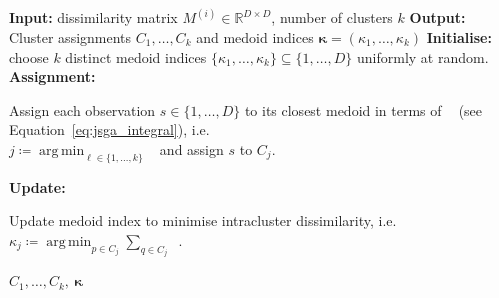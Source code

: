 \documentclass[12pt]{article}
\DeclareMathOperator*{\argmin}{arg\,min}
\newcommand{\eJSGa}[1]{\mathop{\mathrm{eJS}_{i, #1}^{\mathrm{G}_{\lambda}}}\nolimits}
\begin{document}
\begin{algorithm}[H]
  \caption{Partitioning Around Medoids (PAM) algorithm using the $\eJSGa{}$ divergence.}
  \label{alg:kmedoids_kappa}
  \begin{algorithmic}[1]
    \State \textbf{Input:} dissimilarity matrix $M^{(i)}\in\mathbb{R}^{D\times D}$, number of clusters $k$
    \State \textbf{Output:} Cluster assignments $C_1,\dots,C_k$ and medoid indices $\boldsymbol{\kappa}=(\kappa_1,\dots,\kappa_k)$
    \State \textbf{Initialise:} choose $k$ distinct medoid indices $\{\kappa_1,\dots,\kappa_k\}\subseteq\{1,\dots,D\}$ uniformly at random.
    \Repeat
    \State \textbf{Assignment:} \parbox[t]{.82\linewidth}{\raggedright Assign each observation $s\in\{1,\dots,D\}$ to its closest medoid in terms of $\eJSGa{}$ (see Equation~\eqref{eq:jsga_integral}), i.e.\ \\ $j \coloneq \argmin_{\ell\in\{1,\dots,k\}} \eJSGa{s,\kappa_\ell}$ and assign $s$ to $C_j$.}
        \State \textbf{Update:} \parbox[t]{.82\linewidth}{\raggedright Update medoid index to minimise intracluster dissimilarity, i.e.\ $\kappa_j \coloneq \argmin_{p\in C_j}\sum_{q\in C_j} \eJSGa{p,q}$.}
        \State {}
      \EndFor
    \State \Return $C_1,\dots,C_k,\ \boldsymbol{\kappa}$
  \end{algorithmic}
\end{algorithm}


\end{document}
